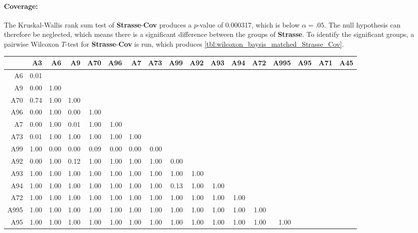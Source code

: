 \paragraph{Coverage:}
The Kruskal-Wallis rank sum test of \textbf{Strasse}-\textbf{Cov} produces a $p$-value of 0.000317, which is below $\alpha=.05$. The null hypothesis can therefore be neglected, which means there is a significant difference between the groups of \textbf{Strasse}. To identify the significant groups, a pairwise Wilcoxon $T$-test for \textbf{Strasse}-\textbf{Cov} is run, which produces \autoref{tbl:wilcoxon_baysis_matched_Strasse_Cov}. 
\begin{table}[ht]
	\tiny
	\setlength{\tabcolsep}{4pt}
	\centering
	\begin{tabular}{rrrrrrrrrrrrrrrrr}
	  	\toprule
				& A3   & A6   & A9   & A70  & A96  & A7   & A73 & A99 & A92 & A93 & A94 & A72 & A995 & A95 & A71 & A45 \\ 
	  	\midrule
		A6 		& 0.01 &  &  &  &  &  &  &  &  &  &  &  &  &  &  &  \\ 
	  	A9 		& 0.00 & 1.00 &  &  &  &  &  &  &  &  &  &  &  &  &  &  \\ 
	  	A70 	& 0.74 & 1.00 & 1.00 &  &  &  &  &  &  &  &  &  &  &  &  &  \\ 
	  	A96 	& 0.00 & 1.00 & 0.00 & 1.00 &  &  &  &  &  &  &  &  &  &  &  &  \\ 
	  	A7 		& 0.00 & 1.00 & 0.01 & 1.00 & 1.00 &  &  &  &  &  &  &  &  &  &  &  \\ 
	  	A73 	& 0.01 & 1.00 & 1.00 & 1.00 & 1.00 & 1.00 &  &  &  &  &  &  &  &  &  &  \\ 
	  	A99 	& 1.00 & 0.00 & 0.00 & 0.09 & 0.00 & 0.00 & 0.00 &  &  &  &  &  &  &  &  &  \\ 
	  	A92 	& 0.00 & 1.00 & 0.12 & 1.00 & 1.00 & 1.00 & 1.00 & 0.00 &  &  &  &  &  &  &  &  \\ 
	  	A93 	& 1.00 & 1.00 & 1.00 & 1.00 & 1.00 & 1.00 & 1.00 & 1.00 & 1.00 &  &  &  &  &  &  &  \\ 
	  	A94 	& 1.00 & 1.00 & 1.00 & 1.00 & 1.00 & 1.00 & 1.00 & 0.13 & 1.00 & 1.00 &  &  &  &  &  &  \\ 
	  	A72 	& 1.00 & 1.00 & 1.00 & 1.00 & 1.00 & 1.00 & 1.00 & 1.00 & 1.00 & 1.00 & 1.00 &  &  &  &  &  \\ 
	  	A995 	& 1.00 & 1.00 & 1.00 & 1.00 & 1.00 & 1.00 & 1.00 & 1.00 & 1.00 & 1.00 & 1.00 & 1.00 &  &  &  &  \\ 
	  	A95 	& 1.00 & 1.00 & 1.00 & 1.00 & 1.00 & 1.00 & 1.00 & 1.00 & 1.00 & 1.00 & 1.00 & 1.00 & 1.00 &  &  &  \\ 

\end{tabular}
\end{table}
